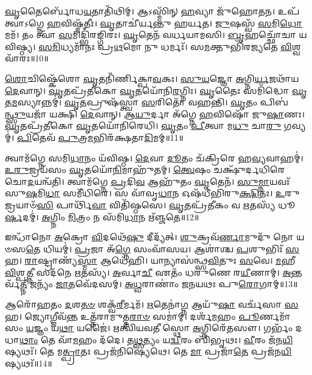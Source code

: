 \-\ul{𑌘𑍃}\-𑌤𑍈𑌰𑍍𑌬𑍋᳴𑌧\-\ul{𑌯}\-𑌤𑌾𑌤𑌿᳴𑌥𑌿𑌮𑍍।
𑌆𑌽𑌸𑍍𑌮𑌿᳴𑌨𑍍 \ul{𑌹}\-𑌵𑍍𑌯𑌾 𑌜𑍁᳴𑌹𑍋𑌤𑌨।
𑌉𑌪᳴ 𑌤𑍍𑌵𑌾\-𑌽𑌗𑍍𑌨𑍇 \ul{𑌹}\-𑌵𑌿𑌷𑍍𑌮᳴𑌤𑍀𑌃।
\-\ul{𑌘𑍃}\-𑌤𑌾𑌚𑍀॑𑌰𑍍𑌯𑌨𑍍𑌤𑍁 𑌹𑌰𑍍𑌯𑌤।
\-\ul{𑌜𑍁}\-𑌷𑌸𑍍𑌵᳴ \ul{𑌸}\-𑌮𑌿\-\ul{𑌧𑍋} 𑌮𑌮᳴।
𑌤𑌂 𑌤𑍍𑌵𑌾᳴ \ul{𑌸}\-𑌮𑌿𑌦𑍍𑌭𑌿᳴𑌰𑌙𑍍𑌗𑌿𑌰𑌃।
\-\ul{𑌘𑍃}\-𑌤𑍇𑌨᳴ 𑌵𑌰𑍍𑌧𑌯𑌾𑌮𑌸𑌿।
\-\ul{𑌬𑍃}\-𑌹𑌚𑍍𑌛𑍋᳴𑌚𑌾 𑌯𑌵𑌿𑌷𑍍𑌠𑍍𑌯।
\-\ul{𑌸}\-\-\ul{𑌮𑌿}\-𑌧𑍍𑌯𑌮𑌾᳴𑌨𑌃 𑌪𑍍𑌰\-\ul{𑌥}\-𑌮𑍋 𑌨𑍁 𑌧𑌰𑍍𑌮𑌃᳴।
𑌸\-\ul{𑌮}\-𑌕𑍍𑌤𑍁𑌭𑌿᳴𑌰𑌜𑍍𑌯𑌤𑍇 \ul{𑌵𑌿}\-𑌶𑍍𑌵𑌵𑌾᳴𑌰𑌃॥10॥

\-\ul{𑌶𑍋}\-𑌚𑌿𑌷𑍍𑌕𑍇᳴𑌶𑍋 \ul{𑌘𑍃}\-𑌤𑌨𑌿᳴𑌰𑍍𑌣𑌿𑌕𑍍𑌪𑌾\-\ul{𑌵}\-𑌕𑌃।
\-\ul{𑌸𑍁}\-\-\ul{𑌯}\-𑌜𑍍𑌞𑍋 \ul{𑌅}\-𑌗𑍍𑌨𑌿\-\ul{𑌰𑍍𑌯}\-𑌜𑌥𑌾᳴𑌯 \ul{𑌦𑍇}\-𑌵𑌾𑌨𑍍।
\-\ul{𑌘𑍃}\-𑌤𑌪𑍍𑌰᳴𑌤𑍀𑌕𑍋 \ul{𑌘𑍃}\-𑌤𑌯𑍋᳴𑌨𑌿\-\ul{𑌰}\-𑌗𑍍𑌨𑌿𑌃।
\-\ul{𑌘𑍃}\-𑌤𑍈𑌃 𑌸𑌮𑌿᳴𑌦𑍍𑌧𑍋 \ul{𑌘𑍃}\-𑌤\-\ul{𑌮}\-𑌸𑍍𑌯𑌾𑌨𑍍𑌨𑌮𑍍॑।
\-\ul{𑌘𑍃}\-\-\ul{𑌤}\-𑌪𑍍𑌰𑍁𑌷᳴𑌸𑍍𑌤𑍍𑌵𑌾 \ul{𑌸}\-𑌰𑌿𑌤𑍋᳴ 𑌵𑌹𑌨𑍍𑌤𑌿।
\-\ul{𑌘𑍃}\-𑌤𑌂 𑌪𑌿𑌬॑\-\ul{𑌨𑍍𑌥𑍍𑌸𑍁}\-𑌯𑌜𑌾᳴ 𑌯𑌕𑍍𑌷𑌿 \ul{𑌦𑍇}\-𑌵𑌾𑌨𑍍।
\-\ul{𑌆}\-\-\ul{𑌯𑍁}\-𑌰𑍍𑌦𑌾 𑌅᳴𑌗𑍍𑌨𑍇 \ul{𑌹}\-𑌵𑌿𑌷𑍋᳴ 𑌜𑍁\-\ul{𑌷𑌾}\-𑌣𑌃।
\-\ul{𑌘𑍃}\-𑌤𑌪𑍍𑌰᳴𑌤𑍀𑌕𑍋 \ul{𑌘𑍃}\-𑌤𑌯𑍋᳴𑌨𑌿𑌰𑍇𑌧𑌿।
\-\ul{𑌘𑍃}\-𑌤𑌂 \ul{𑌪𑍀}\-𑌤𑍍𑌵𑌾 𑌮\-\ul{𑌧𑍁} 𑌚𑌾\-\ul{𑌰𑍁} 𑌗𑌵𑍍𑌯𑌮𑍍॑।
\-\ul{𑌪𑌿}\-𑌤𑍇𑌵᳴ \ul{𑌪𑍁}\-𑌤𑍍𑌰\-\ul{𑌮}\-𑌭𑌿𑌰᳴𑌕𑍍𑌷𑌤𑌾\-\ul{𑌦𑌿}\-𑌮𑌮𑍍॥11॥

𑌤𑍍𑌵𑌾𑌮᳴𑌗𑍍𑌨𑍇 𑌸𑌮𑌿\-\ul{𑌧𑌾}\-𑌨𑌂 𑌯᳴𑌵𑌿𑌷𑍍𑌠।
\-\ul{𑌦𑍇}\-𑌵𑌾 \ul{𑌦𑍂}\-𑌤𑌂 𑌚᳴𑌕𑍍𑌰𑌿𑌰𑍇 𑌹\-\ul{𑌵𑍍𑌯}\-𑌵𑌾𑌹𑌮𑍍॑।
\-\ul{𑌉}\-\-\ul{𑌰𑍁}\-𑌜𑍍𑌰𑌯᳴𑌸𑌂 \ul{𑌘𑍃}\-𑌤𑌯𑍋᳴\-\ul{𑌨𑌿}\-𑌮𑌾𑌹𑍁᳴𑌤𑌮𑍍।
\-\ul{𑌤𑍍𑌵𑍇}\-𑌷𑌂 𑌚𑌕𑍍𑌷𑍁᳴𑌰𑍍𑌦𑌧𑌿𑌰𑍇 𑌚𑍋\-\ul{𑌦}\-𑌯𑌨𑍍𑌵᳴𑌤𑌿।
𑌤𑍍𑌵𑌾𑌮᳴𑌗𑍍𑌨𑍇 \ul{𑌪𑍍𑌰}\-𑌦𑌿\-\ul{𑌵} 𑌆𑌹𑍁᳴𑌤𑌂 \ul{𑌘𑍃}\-𑌤𑍇𑌨᳴।
\-\ul{𑌸𑍁}\-\-\ul{𑌮𑍍𑌨𑌾}\-𑌯𑌵𑌃᳴ 𑌸𑍁\-\ul{𑌷}\-𑌮𑌿\-\ul{𑌧𑌾} 𑌸𑌮𑍀᳴𑌧𑌿𑌰𑍇।
𑌸 𑌵𑌾᳴𑌵𑍃\-\ul{𑌧𑌾}\-𑌨 𑌓𑌷᳴𑌧𑍀𑌭𑌿𑌰𑍁\-\ul{𑌕𑍍𑌷𑌿}\-𑌤𑌃।
\-\ul{𑌉}\-𑌰𑍁 𑌜𑍍𑌰𑌯𑌾𑍞᳴\-\ul{𑌸𑌿} 𑌪𑌾𑌰𑍍𑌥𑌿᳴\-\ul{𑌵𑌾} 𑌵𑌿𑌤𑌿᳴𑌷𑍍𑌠𑌸𑍇।
\-\ul{𑌘𑍃}\-𑌤𑌪𑍍𑌰᳴𑌤𑍀𑌕𑌂 𑌵 \ul{𑌋}\-𑌤𑌸𑍍𑌯᳴ 𑌧𑍂\-\ul{𑌰𑍍}\-𑌷𑌦𑌮𑍍॑।
\-\ul{𑌅}\-𑌗𑍍𑌨𑌿𑌂 \ul{𑌮𑌿}\-𑌤𑍍𑌰𑌂 𑌨 𑌸᳴𑌮𑌿\-\ul{𑌧𑌾}\-𑌨 𑌋᳴𑌞𑍍𑌜𑌤𑍇॥12॥

𑌇𑌨𑍍𑌧𑌾᳴𑌨𑍋 \ul{𑌅}\-𑌕𑍍𑌰𑍋 \ul{𑌵𑌿}\-𑌦𑌥𑍇᳴\-\ul{𑌷𑍁} 𑌦𑍀𑌦𑍍𑌯᳴𑌤𑍍।
\-\ul{𑌶𑍁}\-𑌕𑍍𑌰𑌵᳴\-\ul{𑌰𑍍𑌣𑌾}\-𑌮𑍁𑌦𑍁᳴ 𑌨𑍋 𑌯𑍞𑌸\-\ul{𑌤𑍇} 𑌧𑌿𑌯𑌮𑍍॑।
\-\ul{𑌪𑍍𑌰}\-𑌜𑌾 𑌅᳴\-\ul{𑌗𑍍𑌨𑍇} 𑌸𑌂𑌵𑌾᳴𑌸𑌯।
𑌆𑌶𑌾॑𑌶𑍍𑌚 \ul{𑌪}\-𑌶𑍁𑌭𑌿𑌃᳴ \ul{𑌸}\-𑌹।
\-\ul{𑌰𑌾}\-𑌷𑍍𑌟𑍍𑌰𑌾𑌣𑍍𑌯᳴\-\ul{𑌸𑍍𑌮𑌾} 𑌆𑌧𑍇᳴𑌹𑌿।
𑌯𑌾𑌨𑍍𑌯𑌾𑌸॑𑌨𑍍𑌥𑍍𑌸\-\ul{𑌵𑌿}\-𑌤𑍁𑌃 \ul{𑌸}\-𑌵𑍇।
\-\ul{𑌮}\-𑌹𑍀 \ul{𑌵𑌿}\-𑌶𑍍𑌪\-\ul{𑌤𑍍𑌨𑍀} 𑌸𑌦᳴𑌨𑍇 \ul{𑌋}\-𑌤𑌸𑍍𑌯᳴।
\-\ul{𑌅}\-𑌰𑍍𑌵𑌾\-\ul{𑌚𑍀} 𑌏𑌤𑌂᳴ 𑌧𑌰𑍁𑌣𑍇 𑌰\-\ul{𑌯𑍀}\-𑌣𑌾𑌮𑍍।
\-\ul{𑌅}\-𑌨𑍍𑌤𑌰𑍍𑌵᳴\-\ul{𑌤𑍍𑌨𑍀} 𑌜𑌨𑍍𑌯𑌂᳴ \ul{𑌜𑌾}\-𑌤𑌵𑍇᳴𑌦𑌸𑌮𑍍।
\-\ul{𑌅}\-\-\ul{𑌧𑍍𑌵}\-𑌰𑌾𑌣𑌾𑌂॑ 𑌜𑌨𑌯𑌥𑌃 𑌪𑍁\-\ul{𑌰𑍋}\-𑌗𑌾𑌮𑍍॥13॥

𑌆𑌰𑍋᳴𑌹𑌤𑌂 \ul{𑌦}\-𑌶\-\ul{𑌤}\-\-\ul{𑍞} 𑌶𑌕𑍍𑌵᳴\-\ul{𑌰𑍀}\-𑌰𑍍𑌮𑌮᳴।
\-\ul{𑌋}\-𑌤𑍇𑌨𑌾॑\-\ul{𑌗𑍍𑌨} 𑌆𑌯𑍁᳴\-\ul{𑌷𑌾} 𑌵𑌰𑍍𑌚᳴𑌸𑌾 \ul{𑌸}\-𑌹।
𑌜𑍍𑌯𑍋𑌗𑍍𑌜𑍀𑌵᳴\-\ul{𑌨𑍍𑌤} 𑌉𑌤𑍍𑌤᳴𑌰𑌾𑌮𑍁𑌤𑍍𑌤\-\ul{𑌰𑌾}\-\-\ul{𑍞} 𑌸𑌮𑌾॑𑌮𑍍।
𑌦𑌰𑍍\mbox{}𑌶᳴\-\ul{𑌮}\-𑌹𑌂 \ul{𑌪𑍂}\-𑌰𑍍𑌣𑌮𑌾᳴𑌸𑌂 \ul{𑌯}\-𑌜𑍍𑌞𑌂 𑌯\-\ul{𑌥𑌾} 𑌯𑌜𑍈॑।
𑌋𑌤𑍍𑌵𑌿᳴𑌯𑌵𑌤𑍀 𑌸𑍍𑌥𑍋 \ul{𑌅}\-𑌗𑍍𑌨𑌿𑌰𑍇᳴𑌤𑌸𑍗।
𑌗𑌰𑍍𑌭𑌂᳴ 𑌦𑌧𑌾\-\ul{𑌥𑌾𑌂} 𑌤𑍇 𑌵𑌾᳴\-\ul{𑌮}\-𑌹𑌂 𑌦᳴𑌦𑍇।
𑌤\-\ul{𑌥𑍍𑌸}\-𑌤𑍍𑌯𑌂 𑌯\-\ul{𑌦𑍍𑌵𑍀}\-𑌰𑌂 𑌬𑌿᳴𑌭𑍃𑌥𑌃।
\-\ul{𑌵𑍀}\-𑌰𑌂 𑌜᳴𑌨\-\ul{𑌯𑌿}\-𑌷𑍍𑌯𑌥𑌃᳴।
𑌤𑍇 𑌮\-\ul{𑌤𑍍𑌪𑍍𑌰𑌾}\-𑌤𑌃 𑌪𑍍𑌰𑌜᳴𑌨𑌿𑌷𑍍𑌯𑍇𑌥𑍇।
𑌤𑍇 \ul{𑌮𑌾} 𑌪𑍍𑌰𑌜𑌾᳴\-\ul{𑌤𑍇} 𑌪𑍍𑌰𑌜᳴𑌨\-\ul{𑌯𑌿}\-𑌷𑍍𑌯𑌥𑌃᳴॥14॥

